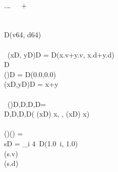\documentclass{article}
\begin{document}
\begin{preview}
\begin{FortressCode}
  \\
 .\lbrace\ldots\rbrace {} \lbrace\,\, \, +\,\rbrace \\
  \\
 \\
 D(v\COLON{}64, d\COLON{}64) \\
 \\
\, \mathord{+}(x\COLONOP{}D, y\COLONOP{}D)\COLONOP{}D = D(x.v+y.v, x.d+y.d) \\
   \llbracket{}D\rrbracket \\
\2\+(\ultrathin)\COLONOP{}D = D(0.0,0.0) \\
  (x\COLONOP{}D,y\COLONOP{}D)\COLONOP{}D = x+y\- \\
 \\
\, \mathord{\sum}(\ultrathin)\COLON {}\llbracket{}D,D,D,D\rrbracket = \\
\2\+\llbracket{}D,D,D,D\rrbracket\bigl( (x\COLONOP{}D) \Rightarrow x, ,  (x\COLONOP{}D) \Rightarrow x\bigr) \\
\- \\
(\ultrathin)\COLON(\ultrathin) =\;  \\
\2\+s\COLONOP{}D = \sum\limits_{i \mathbin{\#}4}\, D(1.0\, i, 1.0) \\
  (s.v) \\
  (s.d)\- \\
 \\
\end{FortressCode}
\end{preview}
\end{document}
